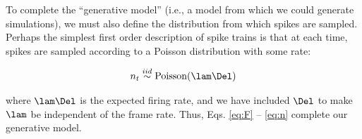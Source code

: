 To complete the ``generative model'' (i.e., a model from which we could generate simulations), we must also define the distribution from which spikes are sampled.  Perhaps the simplest first order description of spike trains is that at each time, spikes are sampled according to a Poisson distribution with some rate:

\begin{align} \label{eq:n}
	n_t \overset{iid}{\sim} \text{Poisson}(\lam \Del)
\end{align}

\noindent where $\lam \Del$ is the expected firing rate, and we have included $\Del$ to make $\lam$ be independent of the frame rate.  Thus, Eqs. \eqref{eq:F} -- \eqref{eq:n} complete our generative model.  











